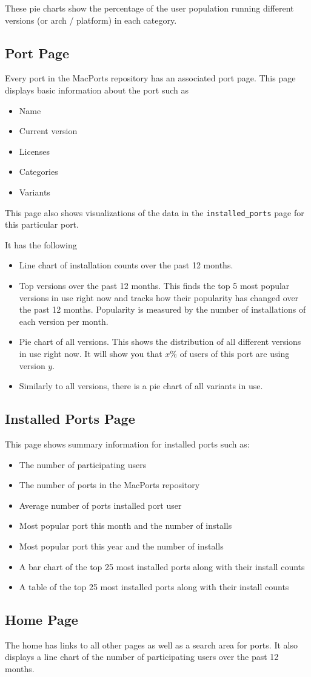 \documentclass[10pt]{article}
\begin{document}
These pie charts show the percentage of the user population running different versions (or arch / platform) in each category.

\subsection{Port Page}

Every port in the MacPorts repository has an associated port page. This page displays basic information about the port such as
\begin{itemize}
  \item Name
  \item Current version
  \item Licenses
  \item Categories
  \item Variants
\end{itemize}

This page also shows visualizations of the data in the \texttt{installed\_ports} page for this particular port.

It has the following
\begin{itemize}
  \item Line chart of installation counts over the past 12 months.
  \item Top versions over the past 12 months. This finds the top 5 most popular versions in use right now and tracks how their popularity has changed over the past 12 months. Popularity is measured by the number of installations of each version per month.
  \item Pie chart of all versions. This shows the distribution of all different versions in use right now. It will show you that \(x\%\) of users of this port are using version \(y\).
  \item Similarly to all versions, there is a pie chart of all variants in use.
\end{itemize}

\subsection{Installed Ports Page}

This page shows summary information for installed ports such as:
\begin{itemize}
  \item The number of participating users
  \item The number of ports in the MacPorts repository
  \item Average number of ports installed port user
  \item Most popular port this month and the number of installs
  \item Most popular port this year and the number of installs
  \item A bar chart of the top 25 most installed ports along with their install counts
  \item A table of the top 25 most installed ports along with their install counts
\end{itemize}

\subsection{Home Page}
The home has links to all other pages as well as a search area for ports. It also displays a line chart of the number of participating users over the past 12 months.
\end{document}
